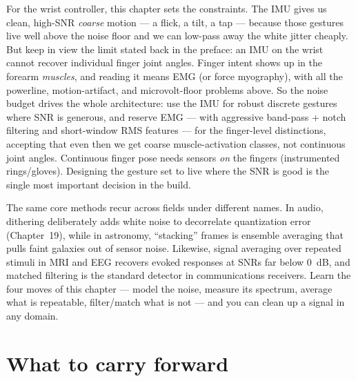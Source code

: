 \begin{goalbox}
For the wrist controller, this chapter sets the constraints. The IMU gives
us clean, high-SNR \emph{coarse} motion --- a flick, a tilt, a tap --- because
those gestures live well above the noise floor and we can low-pass away the white
jitter cheaply. But keep in view the limit stated back in the preface: an IMU
on the wrist cannot recover individual finger joint angles. Finger intent shows
up in the forearm \emph{muscles}, and reading it means EMG (or force myography),
with all the powerline, motion-artifact, and microvolt-floor problems above. So
the noise budget drives the whole architecture: use the IMU for robust discrete
gestures where SNR is generous, and reserve EMG --- with aggressive band-pass +
notch filtering and short-window RMS features --- for the finger-level
distinctions, accepting that even then we get coarse muscle-activation classes,
not continuous joint angles. Continuous finger pose needs sensors \emph{on} the
fingers (instrumented rings/gloves). Designing the gesture set to live where the
SNR is good is the single most important decision in the build.
\end{goalbox}

\begin{applicationbox}
The same core methods recur across fields under different names. In audio, dithering
deliberately adds white noise to decorrelate quantization error (Chapter~19), while in
astronomy, ``stacking'' frames is ensemble averaging that pulls faint galaxies
out of sensor noise. Likewise, signal averaging over repeated stimuli in MRI and EEG
recovers evoked responses at SNRs far below $0$~dB, and matched filtering
is the standard detector in communications receivers. Learn the four moves of this
chapter --- model the noise, measure its spectrum, average what is repeatable,
filter/match what is not --- and you can clean up a signal in any domain.
\end{applicationbox}

\section{What to carry forward}
\label{ch20:summary}

